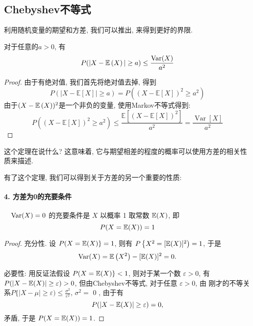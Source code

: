 \subsection{Chebyshev不等式}

利用随机变量的期望和方差, 我们可以推出, 来得到更好的界限. 

\begin{theorem}
    对于任意的$a>0$, 有
    $$
    P(|X-\mathbb E\left(X\right)|\geq a)\leq \frac{\operatorname{Var}(X)}{a^2}
    $$
\end{theorem}

\begin{proof}
    由于有绝对值, 我们首先将绝对值去掉, 得到
    $$
P(|X-\mathbb{E}[X]| \geq a)=P\left((X-\mathbb{E}[X])^2 \geq a^2\right)
$$
由于$(X-\mathbb E\left(X\right))^2$是一个非负的变量, 使用Markov不等式得到: 
$$P\left((X-\mathbb{E}[X])^2 \geq a^2\right) \leq \frac{\mathbb{E}\left[(X-\mathbb{E}[X])^2\right]}{a^2}=\frac{\operatorname{Var}[X]}{a^2}$$


\end{proof}

这个定理在说什么? 这意味着, 它与期望相差的程度的概率可以使用方差的相关性质来描述. 

有了这个定理, 我们可以得到关于方差的另一个重要的性质: 

\paragraph{4. 方差为0的充要条件} $\quad \operatorname{Var}(X)=0$ 的充要条件是 $X$ 以概率 1 取常数 $\mathbb E(X)$, 即
$$
P(X=\mathbb E(X))=1
$$

\begin{proof}
    充分性. 设 $P(X=\mathbb E(X)\}=1$, 则有 $P\left\{X^2=[\mathbb E(X)]^2\right)=1$, 于是
    $$
    \operatorname{Var}(X)=\mathbb E\left(X^2\right)-[\mathbb E(X)]^2=0 .
    $$
    
    必要性: 用反证法假设 $P(X=\mathbb E(X)\}<1$, 则对于某一个数 $\varepsilon>0$, 有 $P(|X-\mathbb E(X)| \geq \varepsilon)>0$, 但由Chebyshev不等式, 对于任意 $\varepsilon>0$, 由 刚才的不等关系$P\{|X-\mu| \geq \varepsilon) \leq \frac{\sigma^2}{\varepsilon^2}$, $\sigma^2=$ 0 , 由于有
    $$
    P(|X-\mathbb E(X)| \geq \varepsilon)=0,
    $$
    矛盾, 于是 $P(X=\mathbb E(X))=1$.
\end{proof}